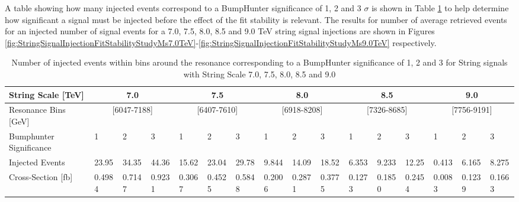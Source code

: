 A table showing how many injected events correspond to a BumpHunter significance of 1, 2 and 3 $\sigma$ is shown in Table \ref{tab:BHSignifcanceStringInjection} to help determine how significant a signal must be injected before the effect of the fit stability is relevant. The results for number of average retrieved events for an injected number of signal events  for a 7.0, 7.5, 8.0, 8.5 and 9.0 TeV string signal injections are shown in Figures \ref{fig:StringSignalInjectionFitStabilityStudyMs7.0TeV}-\ref{fig:StringSignalInjectionFitStabilityStudyMs9.0TeV} respectively. 

\begin{table}[]
    \tiny
    \begin{center}
        \hspace*{-4cm}
        \begin{tabular}{l|lll|lll|lll|lll|lll|}
            \toprule
            \midrule
            String Scale {[}TeV{]}   & \multicolumn{3}{c|}{7.0}             & \multicolumn{3}{c|}{7.5}             &
\multicolumn{3}{c|}{8.0}             & \multicolumn{3}{c|}{8.5}             & \multicolumn{3}{c|}{9.0}             \\
            \midrule
            Resonance Bins {[}GeV{]} & \multicolumn{3}{c|}{{[}6047-7188{]}} & \multicolumn{3}{c|}{{[}6407-7610{]}} & \multicolumn{3}{c|}{{[}6918-8208{]}} & \multicolumn{3}{c|}{{[}7326-8685{]}} & \multicolumn{3}{c|}{{[}7756-9191{]}} \\
            Bumphunter Significance  & 1          & 2          & 3          & 1          & 2          & 3          & 1          & 2          & 3          & 1          & 2          & 3          & 1          & 2          & 3          \\
            Injected Events          & 23.95      & 34.35      & 44.36      & 15.62      & 23.04      & 29.78      & 9.844      & 14.09      & 18.52      & 6.353      & 9.233      & 12.25      & 0.413      & 6.165      & 8.275      \\
            Cross-Section {[}fb{]}   & 0.4984     & 0.7147     & 0.9231     & 0.3067     & 0.4525     & 0.5848     & 0.2006     & 0.2871     & 0.3775     & 0.1273     & 0.1850     & 0.2454     & 0.0083     & 0.1239     & 0.1663 \\
            \midrule
            \bottomrule
            \end{tabular}
        \end{center}
    \caption{Number of injected events within bins around the resonance corresponding to a BumpHunter significance of 1, 2 and 3 for String signals with String Scale 7.0, 7.5, 8.0, 8.5 and 9.0}
    \label{tab:BHSignifcanceStringInjection}
\end{table}
